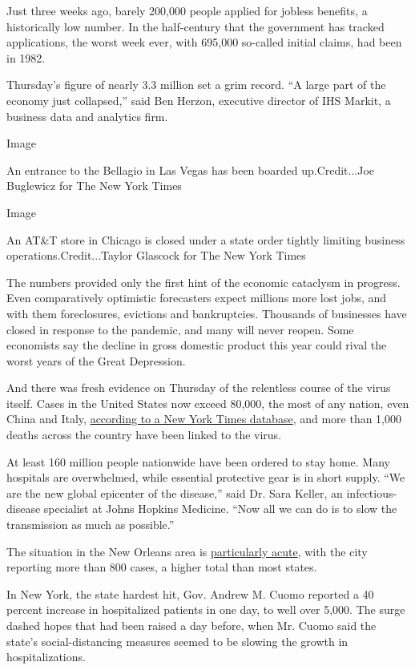 Just three weeks ago, barely 200,000 people applied for jobless
benefits, a historically low number. In the half-century that the
government has tracked applications, the worst week ever, with 695,000
so-called initial claims, had been in 1982.

Thursday's figure of nearly 3.3 million set a grim record. ``A large
part of the economy just collapsed,'' said Ben Herzon, executive
director of IHS Markit, a business data and analytics firm.

Image

An entrance to the Bellagio in Las Vegas has been boarded
up.Credit...Joe Buglewicz for The New York Times

Image

An AT\&T store in Chicago is closed under a state order tightly limiting
business operations.Credit...Taylor Glascock for The New York Times

The numbers provided only the first hint of the economic cataclysm in
progress. Even comparatively optimistic forecasters expect millions more
lost jobs, and with them foreclosures, evictions and bankruptcies.
Thousands of businesses have closed in response to the pandemic, and
many will never reopen. Some economists say the decline in gross
domestic product this year could rival the worst years of the Great
Depression.

And there was fresh evidence on Thursday of the relentless course of the
virus itself. Cases in the United States now exceed 80,000, the most of
any nation, even China and Italy,
\href{https://www.nytimes3xbfgragh.onion/interactive/2020/us/coronavirus-us-cases.html}{according
to a New York Times database}, and more than 1,000 deaths across the
country have been linked to the virus.

At least 160 million people nationwide have been ordered to stay home.
Many hospitals are overwhelmed, while essential protective gear is in
short supply. ``We are the new global epicenter of the disease,'' said
Dr. Sara Keller, an infectious-disease specialist at Johns Hopkins
Medicine. ``Now all we can do is to slow the transmission as much as
possible.''

The situation in the New Orleans area is
\href{https://www.nytimes3xbfgragh.onion/2020/03/26/us/coronavirus-louisiana-new-orleans.html}{particularly
acute}, with the city reporting more than 800 cases, a higher total than
most states.

In New York, the state hardest hit, Gov. Andrew M. Cuomo reported a 40
percent increase in hospitalized patients in one day, to well over
5,000. The surge dashed hopes that had been raised a day before, when
Mr. Cuomo said the state's social-distancing measures seemed to be
slowing the growth in hospitalizations.

